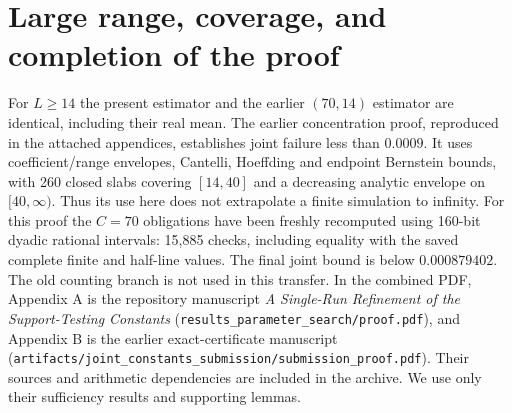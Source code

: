 \documentclass[11pt]{article}
\begin{document}
\section{Large range, coverage, and completion of the proof}
For $L\ge14$ the present estimator and the earlier $(70,14)$ estimator
are identical, including their real mean. The earlier concentration
proof, reproduced in the attached appendices, establishes joint failure
less than $0.0009$. It uses coefficient/range envelopes, Cantelli,
Hoeffding and endpoint Bernstein bounds, with 260 closed slabs covering
$[14,40]$ and a decreasing analytic envelope on $[40,\infty)$.
Thus its use here does not extrapolate a finite simulation to infinity.
For this proof the $C=70$ obligations have been freshly recomputed using
160-bit dyadic rational intervals: 15,885 checks, including equality with
the saved complete finite and half-line values. The final joint bound is
below $0.000879402$. The old counting branch is not used in this transfer.
In the combined PDF, Appendix A is the repository manuscript
\emph{A Single-Run Refinement of the Support-Testing Constants}
(\texttt{results\_parameter\_search/proof.pdf}), and Appendix B is
the earlier exact-certificate manuscript
(\texttt{artifacts/joint\_constants\_submission/submission\_proof.pdf}).
Their sources and arithmetic dependencies are included in the archive.
We use only their sufficiency results and supporting lemmas.
\end{document}
